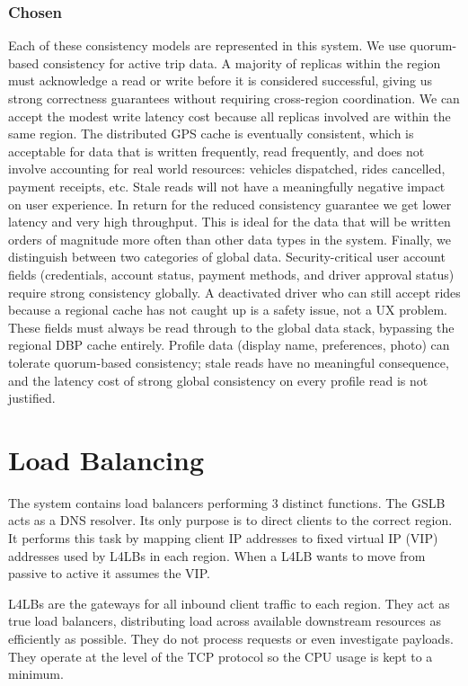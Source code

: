 \documentclass[12pt]{article}
\begin{document}
\subsubsection{Chosen}

Each of these consistency models are represented in this system. We use quorum-based consistency for active trip data. A majority of replicas within the region must acknowledge a read or write before it is considered successful, giving us strong correctness guarantees without requiring cross-region coordination. We can accept the modest write latency cost because all replicas involved are within the same region.
The distributed GPS cache is eventually consistent, which is acceptable for data that is written frequently, read frequently, and does not involve accounting for real world resources: vehicles dispatched, rides cancelled, payment receipts, etc. Stale reads will not have a meaningfully negative impact on user experience. In return for the reduced consistency guarantee we get lower latency and very high throughput. This is ideal for the data that will be written orders of magnitude more often than other data types in the system.
Finally, we distinguish between two categories of global data. Security-critical user account fields (credentials, account status, payment methods, and driver approval status) require strong consistency globally. A deactivated driver who can still accept rides because a regional cache has not caught up is a safety issue, not a UX problem. These fields must always be read through to the global data stack, bypassing the regional DBP cache entirely. Profile data (display name, preferences, photo) can tolerate quorum-based consistency; stale reads have no meaningful consequence, and the latency cost of strong global consistency on every profile read is not justified.


\section{Load Balancing}
\label{sec:load-balancing}

The system contains load balancers performing 3 distinct functions. The GSLB acts as a DNS resolver. Its only purpose is to direct clients to the correct region. It performs this task by mapping client IP addresses to fixed virtual IP (VIP) addresses used by L4LBs in each region. When a L4LB wants to move from passive to active it assumes the VIP.

L4LBs are the gateways for all inbound client traffic to each region. They act as true load balancers, distributing load across available downstream resources as efficiently as possible. They do not process requests or even investigate payloads. They operate at the level of the TCP protocol so the CPU usage is kept to a minimum.
\end{document}
